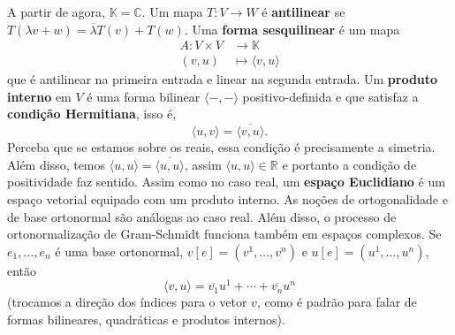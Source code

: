 A partir de agora, $\mathbb{K} = \mathbb{C}$. Um mapa $T \colon V \to W$ é \textbf{antilinear} se $T(\lambda v + w) = \overline{\lambda}T(v) + T(w)$. Uma \textbf{forma sesquilinear} é um mapa \begin{equation}
    \begin{split}
        A \colon V \times V &\to \mathbb{K} \\ (v, u) &\mapsto \langle v, u \rangle
    \end{split}
\end{equation} que é antilinear na primeira entrada e linear na segunda entrada. Um \textbf{produto interno} em $V$ é uma forma bilinear $\langle -,- \rangle$ positivo-definida e que satisfaz a \textbf{condição Hermitiana}, isso é, \begin{equation}
    \langle u,v \rangle = \overline{\langle v, u \rangle}.
\end{equation}
Perceba que se estamos sobre os reais, essa condição é precisamente a simetria. Além disso, temos $\langle u, u \rangle = \overline{\langle u, u \rangle}$, assim $\langle u, u \rangle \in \mathbb{R}$ e portanto a condição de positividade faz sentido. Assim como no caso real, um \textbf{espaço Euclidiano} é um espaço vetorial equipado com um produto interno. As noções de ortogonalidade e de base ortonormal são análogas ao caso real. Além disso, o processo de ortonormalização de Gram-Schmidt funciona também em espaços complexos. Se $e_1, \dots, e_n$ é uma base ortonormal, $v[e] = (v^1, \dots, v^n)$ e $u[e] = (u^1, \dots, u^n)$, então \begin{equation}
    \langle v, u \rangle = \overline{v_1}u^1 + \cdots + \overline{v_n}u^n
\end{equation} (trocamos a direção dos índices para o vetor $v$, como é padrão para falar de formas bilineares, quadráticas e produtos internos).

